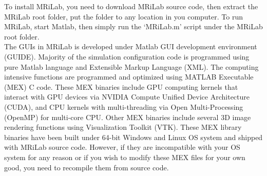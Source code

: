 \documentclass{book}%
\begin{document}
To install MRiLab, you need to download MRiLab source code, then extract the MRiLab root folder, put the folder to any location in you computer. To run MRiLab, start Matlab, then simply run the `MRiLab.m' script under the MRiLab root folder. \\

The GUIs in MRiLab is developed under Matlab GUI development environment (GUIDE). Majority of the simulation configuration code is programmed using pure Matlab language and Extensible Markup Language (XML). The computing intensive functions are programmed and optimized using MATLAB Executable (MEX) C code. These MEX binaries include GPU computing kernels that interact with GPU devices via NVIDIA Compute Unified Device Architecture (CUDA), and CPU kernels with multi-threading via Open Multi-Processing (OpenMP) for multi-core CPU. Other MEX binaries include several 3D image rendering functions using Visualization Toolkit (VTK). These MEX library binaries have been built under 64-bit Windows and Linux OS system and shipped with MRiLab source code. However, if they are incompatible with your OS system for any reason or if you wish to modify these MEX files for your own good, you need to recompile them from source code. \\
\end{document}
